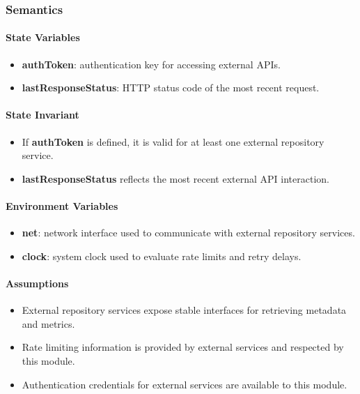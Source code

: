 \documentclass[12pt, titlepage]{article}
\begin{document}
\subsubsection{Semantics}

\paragraph{State Variables}
\begin{itemize}
  \item \textbf{authToken}: authentication key for accessing external APIs.
  \item \textbf{lastResponseStatus}: HTTP status code of the most recent request.
\end{itemize}

\paragraph{State Invariant}
\begin{itemize}
  \item If \textbf{authToken} is defined, it is valid for at least one external repository service.
  \item \textbf{lastResponseStatus} reflects the most recent external API interaction.
\end{itemize}

\paragraph{Environment Variables}
\begin{itemize}
  \item \textbf{net}: network interface used to communicate with external repository services.
  \item \textbf{clock}: system clock used to evaluate rate limits and retry delays.
\end{itemize}

\paragraph{Assumptions}
\begin{itemize}
  \item External repository services expose stable interfaces for retrieving metadata and metrics.
  \item Rate limiting information is provided by external services and respected by this module.
  \item Authentication credentials for external services are available to this module.
\end{itemize}
\end{document}
